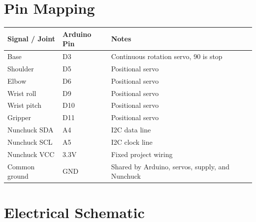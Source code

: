 \documentclass[a4paper,11pt]{article}
\begin{document}
\section{Pin Mapping}

\begin{center}
\begin{tabularx}{\textwidth}{>{\ttfamily}l >{\ttfamily}l X}
\toprule
Signal / Joint & Arduino Pin & Notes \\
\midrule
Base & D3 & Continuous rotation servo, 90 is stop \\
Shoulder & D5 & Positional servo \\
Elbow & D6 & Positional servo \\
Wrist roll & D9 & Positional servo \\
Wrist pitch & D10 & Positional servo \\
Gripper & D11 & Positional servo \\
Nunchuck SDA & A4 & I2C data line \\
Nunchuck SCL & A5 & I2C clock line \\
Nunchuck VCC & 3.3V & Fixed project wiring \\
Common ground & GND & Shared by Arduino, servos, supply, and Nunchuck \\
\bottomrule
\end{tabularx}
\end{center}

\section{Electrical Schematic}
\end{document}
